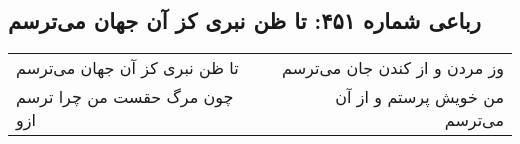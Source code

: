 \begin{center}
\section*{رباعی شماره ۴۵۱: تا ظن نبری کز آن جهان می‌ترسم}
\label{sec:sh451}
\begin{longtable}{l p{0.5cm} r}
تا ظن نبری کز آن جهان می‌ترسم
&&
وز مردن و از کندن جان می‌ترسم
\\
چون مرگ حقست من چرا ترسم ازو
&&
من خویش پرستم و از آن می‌ترسم
\\
\end{longtable}
\end{center}

